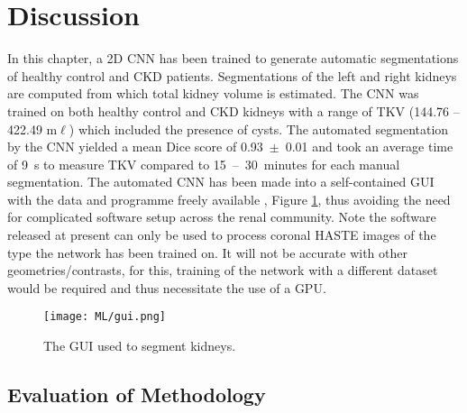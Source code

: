 \newpage

\section{Discussion}
In this chapter, a 2D \ac{CNN} has been trained to generate automatic segmentations of healthy control and \ac{CKD} patients. Segmentations of the left and right kidneys are computed from which total kidney volume is estimated. The \ac{CNN} was trained on both healthy control and \ac{CKD} kidneys with a range of \ac{TKV} (144.76 – 422.49 m$\ell$) which included the presence of cysts. The automated segmentation by the \ac{CNN} yielded a mean Dice score of 0.93~$\pm$~0.01 and took an average time of 9~s to measure \ac{TKV} compared to 15~–~30~minutes \cite{zollner_assessment_2012} for each manual segmentation. The automated \ac{CNN} has been made into a self-contained \ac{GUI} with the data and programme freely available \cite{daniel_alexdaniel654renal_segmentor_2020}, Figure \ref{fig:ml_gui}, thus avoiding the need for complicated software setup across the renal community. Note the software released at present can only be used to process coronal \ac{HASTE} images of the type the network has been trained on. It will not be accurate with other geometries/contrasts, for this, training of the network with a different dataset would be required and thus necessitate the use of a \ac{GPU}.

\begin{figure}[H]
	\centering
	\texttt{[image: ML/gui.png]}
	\caption{The \acf{GUI} used to segment kidneys.}
	\label{fig:ml_gui}	
\end{figure}

\newpage
\subsection{Evaluation of Methodology}

